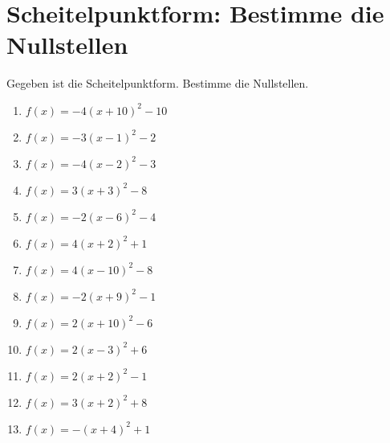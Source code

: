 \documentclass{article}%
\begin{document}
\section{Scheitelpunktform: Bestimme die Nullstellen}%
\label{sec:ScheitelpunktformBestimmedieNullstellen}%
Gegeben ist die Scheitelpunktform. Bestimme die Nullstellen.%
\begin{enumerate}[label=\alph*)]%
\item%
\newline\vspace{0.5cm} $f(x)=-4(x+10)^2 -10$%
\item%
\newline\vspace{0.5cm} $f(x)=-3(x-1)^2 -2$%
\item%
\newline\vspace{0.5cm} $f(x)=-4(x-2)^2 -3$%
\item%
\newline\vspace{0.5cm} $f(x)=3(x+3)^2 -8$%
\item%
\newline\vspace{0.5cm} $f(x)=-2(x-6)^2 -4$%
\item%
\newline\vspace{0.5cm} $f(x)=4(x+2)^2 +1$%
\item%
\newline\vspace{0.5cm} $f(x)=4(x-10)^2 -8$%
\item%
\newline\vspace{0.5cm} $f(x)=-2(x+9)^2 -1$%
\item%
\newline\vspace{0.5cm} $f(x)=2(x+10)^2 -6$%
\item%
\newline\vspace{0.5cm} $f(x)=2(x-3)^2 +6$%
\item%
\newline\vspace{0.5cm} $f(x)=2(x+2)^2 -1$%
\item%
\newline\vspace{0.5cm} $f(x)=3(x+2)^2 +8$%
\item%
\newline\vspace{0.5cm} $f(x)=-(x+4)^2 +1$%

\end{enumerate}
\end{document}
